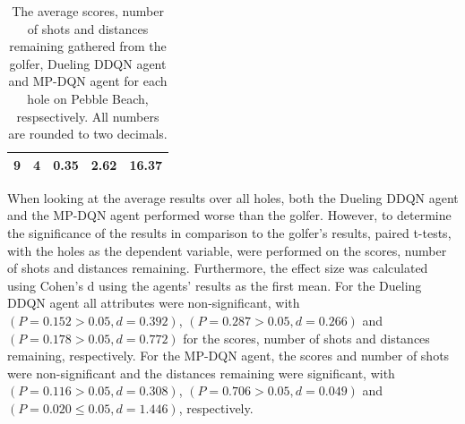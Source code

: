 \documentclass{kththesis}
\begin{document}
\begin{table}
\begin{subtable}{0.3\textwidth}
{\begin{tabular}{|c|c|c|c|c|}
        9 & 4 & 0.35 & 2.62 & 16.37 \\ \hline
    \end{tabular}
    }
    \end{subtable}
    \hfill
    \begin{subtable}{0.3\textwidth}
    \centering
    \end{subtable}
    \caption{The average scores, number of shots and distances remaining gathered from the golfer, Dueling DDQN agent and MP-DQN agent for each hole on Pebble Beach, respsectively. All numbers are rounded to two decimals.}
    \label{tab:pebble_average_results}
\end{table}

When looking at the average results over all holes, both the Dueling DDQN agent and the MP-DQN agent performed worse than the golfer. However, to determine the significance of the results in comparison to the golfer's results, paired t-tests, with the holes as the dependent variable, were performed on the scores, number of shots and distances remaining. Furthermore, the effect size was calculated using Cohen's d using the agents' results as the first mean. For the Dueling DDQN agent all attributes were non-significant, with $(P = 0.152 > 0.05, d = 0.392)$, $(P = 0.287 > 0.05, d = 0.266)$ and $(P = 0.178 > 0.05, d=0.772)$ for the scores, number of shots and distances remaining, respectively. For the MP-DQN agent, the scores and number of shots were non-significant and the distances remaining were significant, with $(P = 0.116 > 0.05, d = 0.308)$, $(P = 0.706 > 0.05, d = 0.049)$ and $(P = 0.020 \leq 0.05, d = 1.446)$, respectively.
\end{document}
